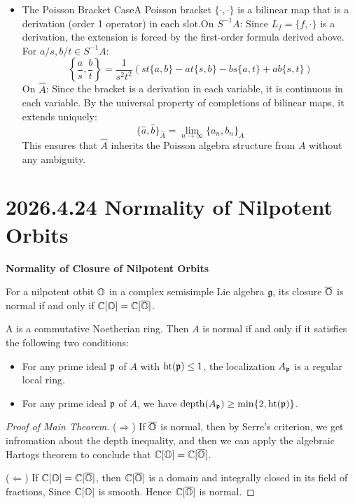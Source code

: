 \documentclass[12pt]{amsart}
\numberwithin{equation}{section}
\newcommand{\fg}{\mathfrak{g}} \newcommand{\fh}{\mathfrak{h}} \newcommand{\fk}{\mathfrak{k}}
\renewcommand{\bar}{\overline}
\renewcommand{\hat}{\widehat}
\begin{document}
{\begin{itemize}
    \item The Poisson Bracket CaseA Poisson bracket $\{ \cdot, \cdot \}$ is a bilinear map that is a derivation (order 1 operator) in each slot.On $S^{-1}A$: Since $L_f = \{f, \cdot\}$ is a derivation, the extension is forced by the first-order formula derived above. For $a/s, b/t \in S^{-1}A$:$$\left\{ \frac{a}{s}, \frac{b}{t} \right\} = \frac{1}{s^2 t^2} \left( st\{a, b\} - at\{s, b\} - bs\{a, t\} + ab\{s, t\} \right)$$On $\widehat{A}$: Since the bracket is a derivation in each variable, it is continuous in each variable. By the universal property of completions of bilinear maps, it extends uniquely:$$\{ \hat{a}, \hat{b} \}_{\widehat{A}} = \lim_{n \to \infty} \{ a_n, b_n \}_A$$This ensures that $\widehat{A}$ inherits the Poisson algebra structure from $A$ without any ambiguity.
  \end{itemize}
  }





\section{2026.4.24 Normality of Nilpotent Orbits}

\textbf{Normality of Closure of Nilpotent Orbits}

\begin{thm}
  For a nilpotent otbit ${\mathbb {O}}$ in a complex semisimple Lie algebra $\fg$, its closure $\bar{\BO}$ is normal if and only if $\BC[\BO] = \BC[\bar{\BO}]$.
\end{thm}

\begin{lem}
  A is a commutative Noetherian ring. Then $A$ is normal if and only if it satisfies the following two conditions:
\begin{itemize}
  \item [($R_1$)] For any prime ideal $\mathfrak{p}$ of $A$ with $\mathrm{ht}(\mathfrak{p}) \leq 1$, the localization $A_{\mathfrak{p}}$ is a regular local ring.
  \item [($S_2$)] For any prime ideal $\mathfrak{p}$ of $A$, we have $\mathrm{depth}(A_{\mathfrak{p}}) \geq \min\{2, \mathrm{ht}(\mathfrak{p})\}$.
\end{itemize}
\end{lem}

\begin{proof}[Proof of Main Theorem]
  ($\Rightarrow$) If $\bar{\BO}$ is normal, then by Serre's criterion, we get infromation about the depth inequality, and then we can apply the algebraic Hartogs theorem \cite[Chapter III, Exercise 3.5]{Har77} to conclude that $\BC[\BO] = \BC[\bar{\BO}]$.

  ($\Leftarrow$) If $\BC[\BO] = \BC[\bar{\BO}]$, then $\BC[\bar{\BO}]$ is a domain and integrally closed in its field of fractions, Since ${\mathbb {C}}[{\mathbb {O}}]$ is smooth. Hence $\BC[\bar{\BO}]$ is normal.
\end{proof}
\end{document}
